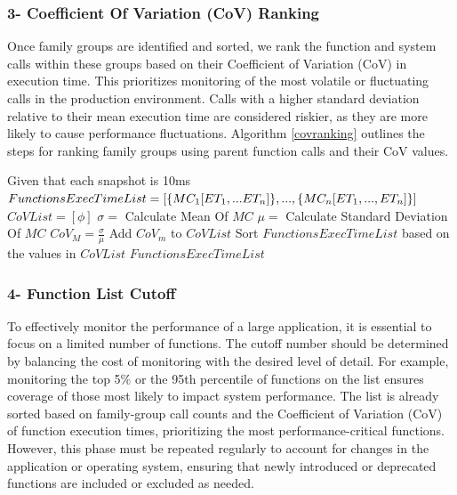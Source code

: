\documentclass[pdflatex,sn-nature]{sn-jnl}%
\theoremstyle{thmstyleone}%
\theoremstyle{thmstyletwo}%
\theoremstyle{thmstylethree}%
\begin{document}
\subsubsection{3- Coefficient Of Variation (CoV) Ranking}

Once family groups are identified and sorted, we rank the function and system calls within these groups based on their Coefficient of Variation (CoV) in execution time. This prioritizes monitoring of the most volatile or fluctuating calls in the production environment. Calls with a higher standard deviation relative to their mean execution time are considered riskier, as they are more likely to cause performance fluctuations. Algorithm \ref{covranking} outlines the steps for ranking family groups using parent function calls and their CoV values.

\begin{algorithm}[tbp]

  \caption{CoV Ranking of Function Calls}\label{covranking}
  \begin{algorithmic}[1]
    \State Given that each snapshot is 10ms
    \State $FunctionsExecTimeList=[\{MC_1[ET_1,...ET_n]\},...,\newline\{MC_n[ET_1,...,ET_n]\}]$
    \State $CoVList=[\phi]$
        \State $\sigma =$ Calculate Mean Of $MC$
        \State $\mu =$ Calculate Standard Deviation Of $MC$
        \State $CoV_M = \frac{\sigma}{\mu}$
        \State Add $CoV_m$ to $CoVList$
    \EndFor
    \State Sort $FunctionsExecTimeList$ based on the values in $CoVList$
    \State \Return $FunctionsExecTimeList$
    
    
  \end{algorithmic}
\end{algorithm}

\subsubsection{4- Function List Cutoff}\label{cutoffsec}

To effectively monitor the performance of a large application, it is essential to focus on a limited number of functions. The cutoff number should be determined by balancing the cost of monitoring with the desired level of detail. For example, monitoring the top 5\% or the 95th percentile of functions on the list ensures coverage of those most likely to impact system performance. The list is already sorted based on family-group call counts and the Coefficient of Variation (CoV) of function execution times, prioritizing the most performance-critical functions. However, this phase must be repeated regularly to account for changes in the application or operating system, ensuring that newly introduced or deprecated functions are included or excluded as needed.
\end{document}

